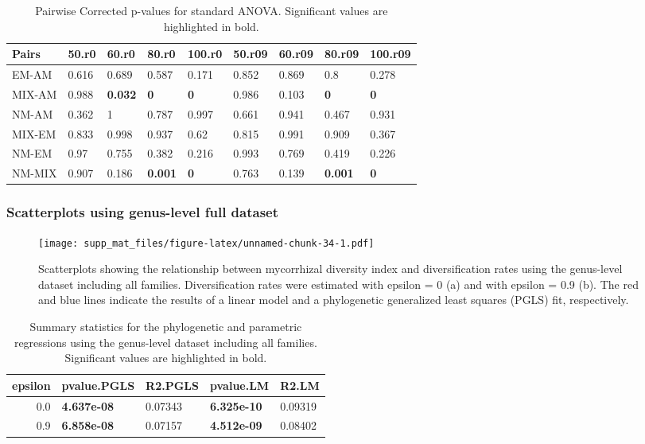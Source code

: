 \documentclass[]{article}
\begin{document}
\begin{table}[H]

\caption{\label{tab:unnamed-chunk-33}Pairwise Corrected p-values for standard ANOVA. Significant values are highlighted in bold.}
\centering
\begin{tabular}{l|l|l|l|l|l|l|l|l}
\hline
Pairs & 50.r0 & 60.r0 & 80.r0 & 100.r0 & 50.r09 & 60.r09 & 80.r09 & 100.r09\\
\hline
EM-AM & 0.616 & 0.689 & 0.587 & 0.171 & 0.852 & 0.869 & 0.8 & 0.278\\
\hline
MIX-AM & 0.988 & \textbf{0.032} & \textbf{0} & \textbf{0} & 0.986 & 0.103 & \textbf{0} & \textbf{0}\\
\hline
NM-AM & 0.362 & 1 & 0.787 & 0.997 & 0.661 & 0.941 & 0.467 & 0.931\\
\hline
MIX-EM & 0.833 & 0.998 & 0.937 & 0.62 & 0.815 & 0.991 & 0.909 & 0.367\\
\hline
NM-EM & 0.97 & 0.755 & 0.382 & 0.216 & 0.993 & 0.769 & 0.419 & 0.226\\
\hline
NM-MIX & 0.907 & 0.186 & \textbf{0.001} & \textbf{0} & 0.763 & 0.139 & \textbf{0.001} & \textbf{0}\\
\hline
\end{tabular}
\end{table}

\hypertarget{scatterplots-using-genus-level-full-dataset}{%
\subsubsection{Scatterplots using genus-level full
dataset}\label{scatterplots-using-genus-level-full-dataset}}

\begin{figure}
\centering
\texttt{[image: supp\_mat\_files/figure-latex/unnamed-chunk-34-1.pdf]}
\caption{Scatterplots showing the relationship between mycorrhizal
diversity index and diversification rates using the genus-level dataset
including all families. Diversification rates were estimated with
epsilon = 0 (a) and with epsilon = 0.9 (b). The red and blue lines
indicate the results of a linear model and a phylogenetic generalized
least squares (PGLS) fit, respectively.}
\end{figure}

\begin{table}[H]

\caption{\label{tab:unnamed-chunk-35}Summary statistics for the phylogenetic and parametric regressions using the genus-level dataset including all families. Significant values are highlighted in bold.}
\centering
\begin{tabular}{r|l|l|l|l}
\hline
epsilon & pvalue.PGLS & R2.PGLS & pvalue.LM & R2.LM\\
\hline
0.0 & \textbf{4.637e-08} & 0.07343 & \textbf{6.325e-10} & 0.09319\\
\hline
0.9 & \textbf{6.858e-08} & 0.07157 & \textbf{4.512e-09} & 0.08402\\
\hline
\end{tabular}
\end{table}
\end{document}
